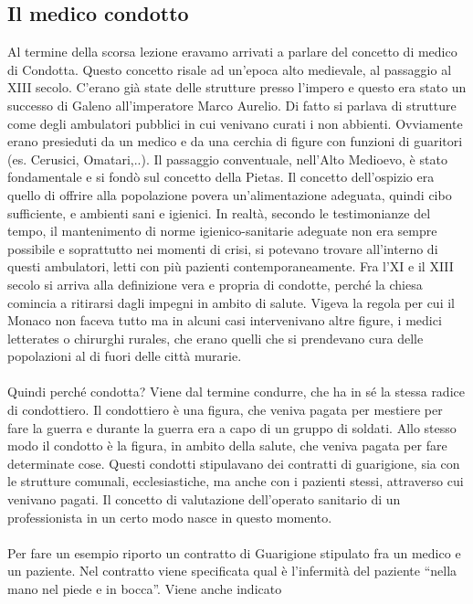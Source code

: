 \subsection{Il medico condotto}

Al termine della scorsa lezione eravamo arrivati a parlare del concetto
di medico di Condotta. Questo concetto risale ad un'epoca alto
medievale, al passaggio al XIII secolo. C'erano già state delle
strutture presso l'impero e questo era stato un successo di Galeno
all'imperatore Marco Aurelio. Di fatto si parlava di strutture come
degli ambulatori pubblici in cui venivano curati i non abbienti.
Ovviamente erano presieduti da un medico e da una cerchia di figure con
funzioni di guaritori (es. Cerusici, Omatari,..). Il passaggio
conventuale, nell'Alto Medioevo, è stato fondamentale e si fondò sul
concetto della Pietas. Il concetto dell'ospizio era quello di offrire
alla popolazione povera un'alimentazione adeguata, quindi cibo
sufficiente, e ambienti sani e igienici. In realtà, secondo le
testimonianze del tempo, il mantenimento di norme igienico-sanitarie
adeguate non era sempre possibile e soprattutto nei momenti di crisi, si
potevano trovare all'interno di questi ambulatori, letti con più
pazienti contemporaneamente. Fra l'XI e il XIII secolo si arriva alla
definizione vera e propria di condotte, perché la chiesa comincia a
ritirarsi dagli impegni in ambito di salute. Vigeva la regola per cui il
Monaco non faceva tutto ma in alcuni casi intervenivano altre figure, i
medici letterates o chirurghi rurales, che erano quelli che si
prendevano cura delle popolazioni al di fuori delle città murarie.
\\\\
Quindi perché condotta? Viene dal termine condurre, che ha in sé la
stessa radice di condottiero. Il condottiero è una figura, che veniva
pagata per mestiere per fare la guerra e durante la guerra era a capo di
un gruppo di soldati. Allo stesso modo il condotto è la figura, in
ambito della salute, che veniva pagata per fare determinate cose. Questi
condotti stipulavano dei contratti di guarigione, sia con le strutture
comunali, ecclesiastiche, ma anche con i pazienti stessi, attraverso cui
venivano pagati. Il concetto di valutazione dell'operato sanitario di un
professionista in un certo modo nasce in questo momento.
\\\\
Per fare un esempio riporto un contratto di Guarigione stipulato fra un
medico e un paziente. Nel contratto viene specificata qual è l'infermità
del paziente ``nella mano nel piede e in bocca''. Viene anche indicato
